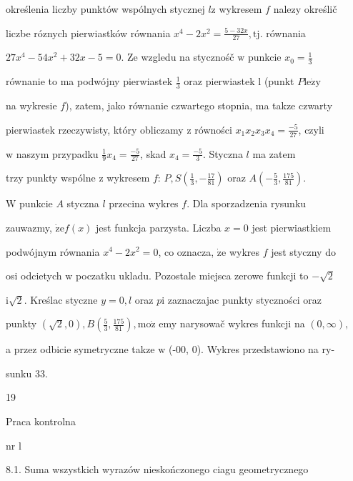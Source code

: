 \documentclass[a4paper,12pt]{article}
\begin{document}
określenia liczby punktów wspólnych stycznej $l\mathrm{z}$ wykresem $f$ nalezy określič

liczbe róznych pierwiastków równania $x^{4}-2x^{2} = \displaystyle \frac{5-32x}{27}, \mathrm{t}\mathrm{j}$. równania

$27x^{4}-54x^{2}+32x-5 = 0$. Ze wzgledu na stycznośč $\mathrm{w}$ punkcie $x_{0} = \displaystyle \frac{1}{3}$

równanie to ma podwójny pierwiastek $\displaystyle \frac{1}{3}$ oraz pierwiastek l (punkt $P\mathrm{l}\mathrm{e}\dot{\mathrm{z}}\mathrm{y}$

na wykresie $f$), zatem, jako równanie czwartego stopnia, ma takze czwarty

pierwiastek rzeczywisty, który obliczamy $\mathrm{z}$ równości $x_{1}x_{2}x_{3}x_{4}=\displaystyle \frac{-5}{27}$, czyli

$\mathrm{w}$ naszym przypadku $\displaystyle \frac{1}{9}x_{4} = \displaystyle \frac{-5}{27}$, skad $x_{4} = \displaystyle \frac{-5}{3}$. Styczna $l$ ma zatem

trzy punkty wspólne $\mathrm{z}$ wykresem $f$: $P, S(\displaystyle \frac{1}{3},-\frac{17}{81})$ oraz $A(-\displaystyle \frac{5}{3},\frac{175}{81}).$

$\mathrm{W}$ punkcie $A$ styczna $l$ przecina wykres $f$. Dla sporzadzenia rysunku

zauwazmy, $\dot{\mathrm{z}}\mathrm{e}f(x)$ jest funkcja parzysta. Liczba $x=0$ jest pierwiastkiem

podwójnym równania $x^{4}-2x^{2}=0$, co oznacza, $\dot{\mathrm{z}}\mathrm{e}$ wykres $f$ jest styczny do

osi odcietych $\mathrm{w}$ poczatku ukladu. Pozostale miejsca zerowe funkcji to $-\sqrt{2}$

$\mathrm{i}\sqrt{2}$. Kreślac styczne $y=0, l$ oraz $p\mathrm{i}$ zaznaczajac punkty styczności oraz

punkty $(\sqrt{2},0), B(\displaystyle \frac{5}{3},\frac{175}{81}), \mathrm{m}\mathrm{o}\dot{\mathrm{z}}$ emy narysowač wykres funkcji na $(0,\infty),$

a przez odbicie symetryczne takze $\mathrm{w}$ (-00, 0). Wykres przedstawiono na ry-

sunku 33.





19

Praca kontrolna

nr l

8.1. Suma wszystkich wyrazów nieskończonego ciagu geometrycznego
\end{document}
